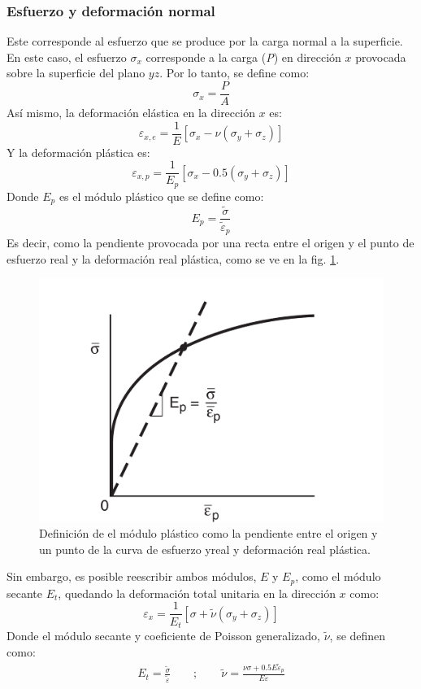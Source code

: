 \subsubsection{Esfuerzo y deformación normal}
Este corresponde al esfuerzo que se produce por la carga normal a la superficie. En este caso, el esfuerzo $\sigma_{x}$ corresponde a la carga (\textit{P}) en dirección $x$ provocada sobre la superficie del plano $yz$. Por lo tanto, se define como:
\begin{equation}
	\sigma_{x} = \frac{P}{A}
\end{equation}
Así mismo, la deformación elástica en la dirección $x$ es:
\begin{equation}
	\varepsilon_{x,e} = \frac{1}{E}\left[\sigma_x - \nu (\sigma_y + \sigma_z)\right]
\end{equation}
Y la deformación plástica es:
\begin{equation}
	\varepsilon_{x,p} = \frac{1}{E_{p}} \left[ \sigma_x - 0.5(\sigma_y + \sigma_z)\right]
\end{equation}
Donde $E_{p}$ es el módulo plástico que se define como:
\begin{equation}
	E_{p} = \frac{\tilde{\sigma}}{\tilde{\varepsilon}_p}
\end{equation}
Es decir, como la pendiente provocada por una recta entre el origen y el punto de esfuerzo real y la deformación real plástica, como se ve en la fig. \ref{fig:e_p}. 
\bigskip
\begin{figure}[h]
\centering
\includegraphics[width=0.6\linewidth]{Imagenes/E_p.pdf}
\caption{Definición de el módulo plástico como la pendiente entre el origen y un punto de la curva de esfuerzo yreal y deformación real plástica. \cite{dowling2013mechanical}}
\label{fig:e_p}
\end{figure}
\newpage

Sin embargo, es posible reescribir ambos módulos, $E$ y $E_{p}$, como el módulo secante $E_t$, quedando la deformación total unitaria en la dirección $x$ como:
\begin{equation}
	\varepsilon_x = \frac{1}{E_t} \left[\sigma + \tilde{\nu}(\sigma_y + \sigma_z)\right]
\end{equation}
Donde el módulo secante y coeficiente de Poisson generalizado, $\tilde{\nu}$, se definen como:
\begin{gather*}
	E_t = \frac{\tilde{\sigma}}{\tilde{\varepsilon}} \qquad ; \qquad \tilde{\nu} = \frac{\nu\sigma + 0.5E\tilde{\varepsilon}_p}{E\varepsilon}
\end{gather*}

